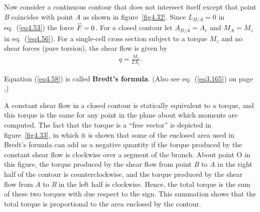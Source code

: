 \documentclass{AeroStructure-ERJohnson}
\def\harp#1{\smash{\mathord{\buildrel{\lower3pt\hbox{$\scriptscriptstyle\rightharpoonup$}}\over{#1}}}}
\begin{document}
Now consider a continuous contour that does not intersect itself except that point \textit{B} coincides with point \textit{A} as shown in figure~\ref{fig4.32}. Since $L_{B/A}=0$ in eq.~(\ref{eq4.53}) the force $\harp{F}=0$. For a closed contour let $A_{B/A}=A_{c}$ and $M_{A}=M_{z}$ in eq.~(\ref{eq4.56}). For a single-cell cross section subject to a torque $M_{z}$ and no shear forces (pure torsion), the shear flow is given by\vspace*{3pt}
\begin{align}\label{eq4.58}
q=\frac{M_{z}}{2 A_{c}}.
\end{align}

\removelastskip

\noindent Equation (\ref{eq4.58}) is called \textbf{Bredt's formula}. (Also see eq.~(\ref{eq3.165}) on page \pageref{eq3.165},)

A constant shear flow in a closed contour is statically equivalent to a torque, and this torque is the same for any point in the plane about which moments are computed. The fact that the torque is a ``free vector'' is depicted in figure~\ref{fig4.33}, in which it is shown that some of the enclosed area used in Bredt's formula can add as a negative quantity if the torque produced by the constant shear flow is clockwise over a segment of the branch. About point O in this figure, the torque produced by the shear flow from point \textit{B} to \textit{A} in the right half of the contour is counterclockwise, and the torque produced by the shear flow from \textit{A} to \textit{B} in the left half is clockwise. Hence, the total torque is the sum of these two torques with due respect to the sign. This summation shows that the total torque is proportional to the area enclosed by the contour.

\pagebreak

{\def\thefigure{4.33}
}
\end{document}
